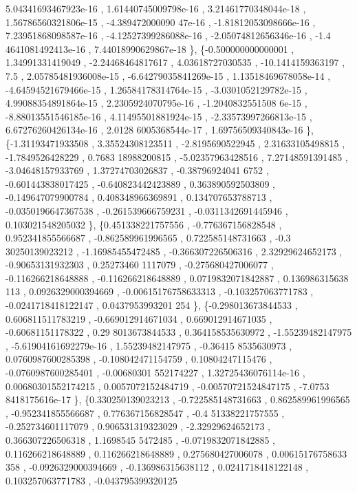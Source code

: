 \begin{DoxyCode}
       5.04341693467923e-16 , 1.61440745009798e-16 , 3.21461770348044e-18 , 1.56786560321806e-15 , -4.389472000090
      47e-16 , -1.81812053098666e-16 , 7.23951868098587e-16 , -4.12527399286088e-16 , -2.05074812656346e-16 , -1.4
      4641081492413e-16 , 7.44018990629867e-18 \},
\{-0.500000000000001 ,  1.34991331419049 , -2.24468464817617 ,  4.03618727030535 , -10.1414159363197 ,      
               7.5 , 2.05785481936008e-15 , -6.64279035841269e-15 , 1.13518469678058e-14 , -4.64594521679466e-15 ,
       1.26584178314764e-15 , -3.0301052129782e-15 , 4.99088354891864e-15 , 2.2305924070795e-16 , -1.2040832551508
      6e-15 , -8.88013551546185e-16 , 4.11495501881924e-15 , -2.33573997266813e-15 , 6.67276260426134e-16 , 2.0128
      6005368544e-17 , 1.69756509340843e-16 \},
\{-1.31193471933508 ,  3.35524308123511 ,  -2.8195690522945 ,  2.31633105498815 ,  -1.7849526428229 , 0.7683
      18988200815 , -5.02357963428516 ,  7.27148591391485 , -3.04648157933769 ,  1.37274703026837 , -0.38796924041
      6752 , -0.601443838017425 , -0.640823442423889 , 0.363890592503809 , -0.149647079900784 , 0.408348966369891 
      , 0.134707653788713 , -0.0350196647367538 , -0.261539666759231 , -0.0311342691445946 , 0.103021548205032 \},
\{0.451338221757556 , -0.776367156828548 , 0.952341855566687 , -0.862589961996565 , 0.722585148731663 , -0.3
      30250139023212 , -1.16985455472485 , -0.366307226506316 ,  2.32929624652173 , -0.90653131932303 , 0.25273460
      1117079 , -0.275680427006077 , -0.116266218648888 , -0.116266218648889 , 0.0719832071842887 , 0.136986315638
      113 , 0.0926329000394669 , -0.00615176758633313 , -0.103257063771783 , -0.0241718418122147 , 0.0437953993201
      254 \},
\{-0.298013673844533 , 0.606811511783219 , -0.669012914671034 , 0.669012914671035 , -0.60681151178322 , 0.29
      8013673844533 , 0.364158535630972 , -1.55239482147975 , -5.61904161692279e-16 ,  1.55239482147975 , -0.36415
      8535630973 , 0.0760987600285398 , -0.108042471154759 ,  0.10804247115476 , -0.0760987600285401 , -0.00680301
      552174227 , 1.32725436076114e-16 , 0.00680301552174215 , 0.0057072152484719 , -0.00570721524847175 , -7.0753
      8418175616e-17 \},
\{0.330250139023213 , -0.722585148731663 , 0.862589961996565 , -0.952341855566687 , 0.776367156828547 , -0.4
      51338221757555 , -0.252734601117079 , 0.906531319323029 , -2.32929624652173 , 0.366307226506318 ,  1.1698545
      5472485 , -0.0719832071842885 , 0.116266218648889 , 0.116266218648889 , 0.275680427006078 , 0.00615176758633
      358 , -0.0926329000394669 , -0.136986315638112 , 0.0241718418122148 , 0.103257063771783 , -0.043795399320125

\end{DoxyCode}
